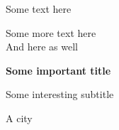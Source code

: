\begin{titlepage}
    \begin{center}
        Some text here

        \vspace{0.5cm}

        Some more text here \\
        And here as well

        \vspace{5cm}
       
        \textbf{Some important title}

        \vspace{0.5cm}
        Some interesting subtitle
            
        \vspace{5cm}

        \hfill
        
        \hfill

        \vfill

        A city \\
        \the\year
    \end{center}
\end{titlepage}
